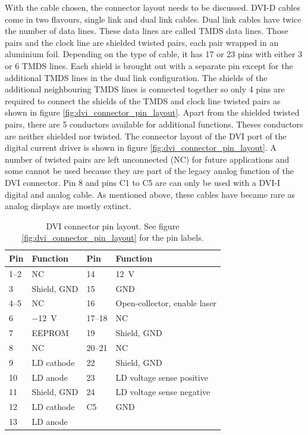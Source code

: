 With the cable chosen, the connector layout needs to be discussed. DVI-D cables come in two flavours, single link and dual link cables. Dual link cables have twice the number of data lines. These data lines are called TMDS data lines. Those pairs and the clock line are shielded twisted pairs, each pair wrapped in an aluminium foil. Depending on the type of cable, it has \num{17} or \num{23} pins with either \num{3} or \num{6} TMDS lines. Each shield is brought out with a separate pin except for the additional TMDS lines in the dual link configuration. The shields of the additional neighbouring TMDS lines is connected together so only \num{4} pins are required to connect the shields of the TMDS and clock line twisted pairs as shown in figure \ref{fig:dvi_connector_pin_layout}. Apart from the shielded twisted pairs, there are \num{5} conductors available for additional functions. Theses conductors are neither shielded nor twisted. The connector layout of the DVI port of the digital current driver is shown in figure \ref{fig:dvi_connector_pin_layout}. A number of twisted pairs are left unconnected (NC) for future applications and some cannot be used because they are part of the legacy analog function of the DVI connector. Pin 8 and pins C1 to C5 are can only be used with a DVI-I digital and analog cable. As mentioned above, these cables have became rare as analog displays are mostly extinct.
\begin{table}[ht]
    \centering
    \begin{tabular}{llll}
        \toprule
        Pin    & Function    & Pin    & Function\\
        \midrule
        \numrange{1}{2}& NC& \num{14}& \qty[retain-explicit-plus]{+12}{\V}\\
        \num{3}& Shield, GND& \num{15}& GND\\
        \numrange{4}{5}& NC& \num{16}& Open-collector, enable laser\\
        \num{6}& \qty{-12}{\V}& \numrange{17}{18}& NC\\
        \num{7}& EEPROM& \num{19}& Shield, GND\\
        \num{8}& NC& \numrange{20}{21}& NC\\
        \num{9}& LD cathode& \num{22}& Shield, GND\\
        \num{10}& LD anode& \num{23}& LD voltage sense positive\\
        \num{11}& Shield, GND& \num{24}& LD voltage sense negative\\
        \num{12}& LD cathode& C5& GND\\
        \num{13}& LD anode& & \\
        \bottomrule
    \end{tabular}
    \caption{DVI connector pin layout. See figure \ref{fig:dvi_connector_pin_layout} for the pin labels.}
    \label{tab:dvi_connector_pin_layout}
\end{table}

